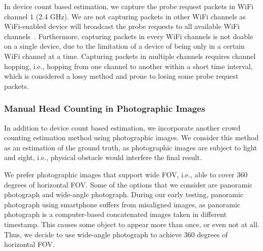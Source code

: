 	In device count based estimation, we capture the probe request packets in WiFi channel 1 (2.4 GHz). We are not capturing packets in other WiFi channels as WiFi-enabled device will broadcast the probe requests to all available WiFi channels~\cite{thesis082}. Furthermore, capturing packets in every WiFi channels is not doable on a single device, due to the limitation of a device of being only in a certain WiFi channel at a time. Capturing packets in multiple channels requires channel hopping, i.e., hopping from one channel to another within a short time interval, which is considered a lossy method and prone to losing some probe request packets.
	

	\subsubsection{Manual Head Counting in Photographic Images} %
	\label{ssub:manual_counting_using_photo}
	In addition to device count based estimation, we incorporate another crowd counting estimation method using photographic images. We consider this method as an estimation of the ground truth, as photographic images are subject to light and sight, i.e., physical obstacle would interfere the final result.
	
	We prefer photographic images that support wide \ac{FOV}, i.e., able to cover 360 degrees of horizontal \ac{FOV}. Some of the options that we consider are panoramic photograph and wide-angle photograph. During our early testing, panoramic photograph using smartphone suffers from misaligned images, as panoramic photograph is a computer-based concatenated images taken in different timestamp. This causes some object to appear more than once, or even not at all. Thus, we decide to use wide-angle photograph to achieve 360 degrees of horizontal \ac{FOV}.


